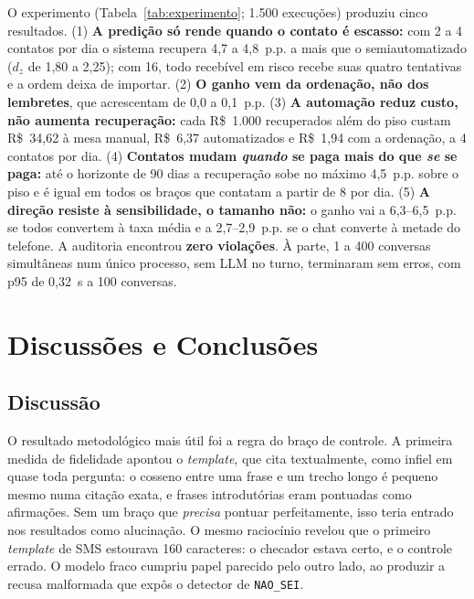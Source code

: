 \documentclass[portuguese]{sbcreviews-2025}%
\begin{document}
O experimento (Tabela~\ref{tab:experimento}; 1.500 execuções) produziu cinco resultados. (1) \textbf{A predição só rende quando o contato é escasso:} com 2 a 4 contatos por dia o sistema recupera 4,7 a 4,8~p.p. a mais que o semiautomatizado ($d_z$ de 1,80 a 2,25); com 16, todo recebível em risco recebe suas quatro tentativas e a ordem deixa de importar. (2) \textbf{O ganho vem da ordenação, não dos lembretes}, que acrescentam de 0,0 a 0,1~p.p. (3) \textbf{A automação reduz custo, não aumenta recuperação:} cada R\$~1.000 recuperados além do piso custam R\$~34,62 à mesa manual, R\$~6,37 automatizados e R\$~1,94 com a ordenação, a 4 contatos por dia. (4) \textbf{Contatos mudam \textit{quando} se paga mais do que \textit{se} se paga:} até o horizonte de 90 dias a recuperação sobe no máximo 4,5~p.p. sobre o piso e é igual em todos os braços que contatam a partir de 8 por dia. (5) \textbf{A direção resiste à sensibilidade, o tamanho não:} o ganho vai a 6,3--6,5~p.p. se todos convertem à taxa média e a 2,7--2,9~p.p. se o chat converte à metade do telefone. A auditoria encontrou \textbf{zero violações}. À parte, 1 a 400 conversas simultâneas num único processo, sem LLM no turno, terminaram sem erros, com p95 de 0,32~s a 100 conversas.

\section{Discussões e Conclusões}
\label{sec:discconclusao}

\subsection{Discussão}
\label{sec:disc}

O resultado metodológico mais útil foi a regra do braço de controle. A primeira medida de fidelidade apontou o \textit{template}, que cita textualmente, como infiel em quase toda pergunta: o cosseno entre uma frase e um trecho longo é pequeno mesmo numa citação exata, e frases introdutórias eram pontuadas como afirmações. Sem um braço que \textit{precisa} pontuar perfeitamente, isso teria entrado nos resultados como alucinação. O mesmo raciocínio revelou que o primeiro \textit{template} de SMS estourava 160 caracteres: o checador estava certo, e o controle errado. O modelo fraco cumpriu papel parecido pelo outro lado, ao produzir a recusa malformada que expôs o detector de \texttt{NAO\_SEI}.
\end{document}
